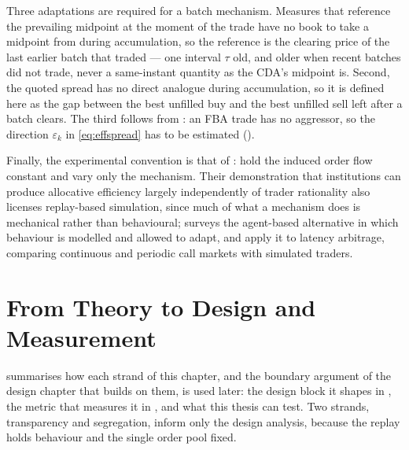 Three adaptations are required for a batch mechanism. Measures that reference
the prevailing midpoint at the moment of the trade have no book to take a
midpoint from during accumulation, so the reference is the clearing price
of the last earlier batch that traded --- one interval $\tau$ old, and
older when recent batches did not trade, never a same-instant quantity as
the CDA's midpoint is. Second, the quoted
spread has no direct analogue during accumulation, so it is defined here
as the gap between the best unfilled buy and the best unfilled sell left
after a batch clears. The third follows from : an
FBA trade has no aggressor, so the direction $\varepsilon_k$ in
\eqref{eq:effspread} has to be estimated ().

Finally, the experimental convention is that of \citet{gode1993allocative}:
hold the induced order flow constant and vary only the mechanism. Their
demonstration that institutions can produce allocative efficiency largely
independently of trader rationality also licenses replay-based simulation,
since much of what a mechanism does is mechanical rather than behavioural;
\citet{lebaron2006agent} surveys the agent-based alternative in which
behaviour is modelled and allowed to adapt, and \citet{wah2013latency}
apply it to latency arbitrage, comparing continuous and periodic call
markets with simulated traders.

\section{From Theory to Design and Measurement}
\label{sec:theorylinks}

 summarises how each strand of this chapter, and
the boundary argument of the design chapter that builds on them, is used
later: the design block it shapes in , the metric that
measures it in , and what this thesis can test. Two
strands, transparency and segregation, inform only the design analysis,
because the replay holds behaviour and the single order pool fixed.

